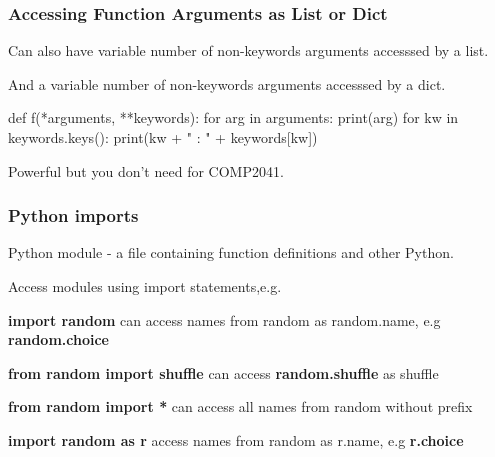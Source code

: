 \begin{frame}[fragile]
\frametitle{Accessing Function Arguments as List or Dict}

Can also have variable number of non-keywords arguments accesssed by a list.

And a variable number of non-keywords arguments accesssed by a dict.

\begin{python}
    def f(*arguments, **keywords):
        for arg in arguments:
            print(arg)
        for kw in keywords.keys():
            print(kw + " : " + keywords[kw])
\end{python}

Powerful but you don't need for COMP2041.

\end{frame}

\begin{frame}[fragile]
\frametitle{Python imports}

Python module - a file containing  function definitions and other Python.

Access modules using import statements,e.g.

{\bf import random} can access names from random as random.name, e.g {\bf random.choice}

{\bf from  random import shuffle} can access {\bf random.shuffle} as shuffle

{\bf from  random import *} can access all names from random without prefix

{\bf import random as r} access names from random as r.name, e.g {\bf r.choice}


\end{frame}

